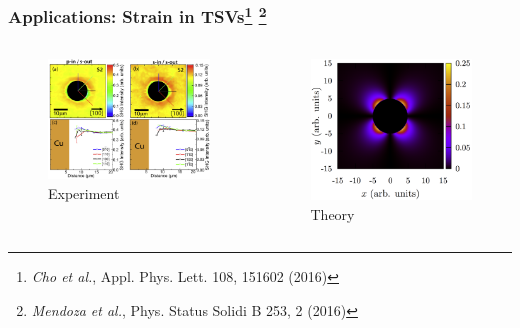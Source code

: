 \documentclass{beamer}
\begin{document}
\begin{frame}
\frametitle{Applications: Strain in TSVs\footnote{\emph{Cho et al.}, Appl. Phys. Lett. 108, 151602 (2016)} \footnote{\emph{Mendoza et al.}, Phys. Status Solidi B 253, 2 (2016)}}
\begin{columns}
\begin{figure}
\centering
\includegraphics[width=\textwidth]{image-yojin}
\vspace*{0.5cm}
\caption{Experiment}
\end{figure}
\begin{figure}
\centering
\includegraphics[width=\textwidth]{image-bms}
\caption{Theory}
\end{figure}
\end{columns}
\end{frame}
\end{document}
